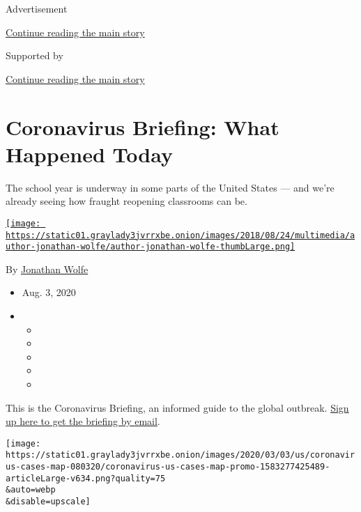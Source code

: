 Advertisement

\protect\hyperlink{after-top}{Continue reading the main story}

Supported by

\protect\hyperlink{after-sponsor}{Continue reading the main story}

\hypertarget{coronavirus-briefing-what-happened-today}{%
\section{Coronavirus Briefing: What Happened
Today}\label{coronavirus-briefing-what-happened-today}}

The school year is underway in some parts of the United States --- and
we're already seeing how fraught reopening classrooms can be.

\href{https://www.nytimes3xbfgragh.onion/by/jonathan-wolfe}{\texttt{[image: https://static01.graylady3jvrrxbe.onion/images/2018/08/24/multimedia/author-jonathan-wolfe/author-jonathan-wolfe-thumbLarge.png]}}

By \href{https://www.nytimes3xbfgragh.onion/by/jonathan-wolfe}{Jonathan
Wolfe}

\begin{itemize}
\item
  Aug. 3, 2020
\item
  \begin{itemize}
  \item
  \item
  \item
  \item
  \item
  \end{itemize}
\end{itemize}

This is the Coronavirus Briefing, an informed guide to the global
outbreak.
\href{https://www.nytimes3xbfgragh.onion/newsletters/coronavirus-briefing}{Sign
up here to get the briefing by email}.

\texttt{[image: https://static01.graylady3jvrrxbe.onion/images/2020/03/03/us/coronavirus-cases-map-080320/coronavirus-us-cases-map-promo-1583277425489-articleLarge-v634.png?quality=75\\\&auto=webp\\\&disable=upscale]}

